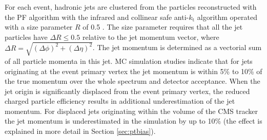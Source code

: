 For each event, hadronic jets are clustered from the particles reconstructed with the PF algorithm
 with the infrared and collinear safe
 anti-$k_\mathrm{t}$ algorithm 
operated with a size parameter $R$ of 0.5 \cite{Cacciari:2008gp}. The size parameter requires that all the jet 
particles have $\Delta R \leq 0.5$ relative to the jet momentum vector, where
 $\Delta R=\sqrt{(\Delta\phi)^2 + (\Delta\eta)^2}$. 
The jet momentum is determined as a vectorial sum of all particle momenta in this jet.
MC simulation studies indicate that for jets originating at the event primary vertex the jet momentum is within 5\% to 10\% of the true momentum over 
the whole \pt spectrum and detector acceptance. 
When the jet origin is significantly displaced from the event primary vertex, the reduced 
charged particle efficiency results in additional underestimation of the jet momentum. 
For displaced jets originating within the volume of the CMS tracker the jet momentum is underestimated in the simulation by up to 10\% (the effect is explained in more detail in Section \ref{sec:ptbias}).

